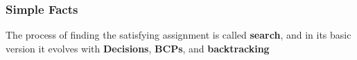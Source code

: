 \begin{frame}
  \frametitle{Simple Facts}
  
  The process of finding the satisfying assignment is called {\bf search}, and
  in its basic version it evolves with {\bf Decisions}, {\bf BCPs}, and
  {\bf backtracking}

  \begin{center}
  \scalebox{.5}{}
  \end{center}

\end{frame}
